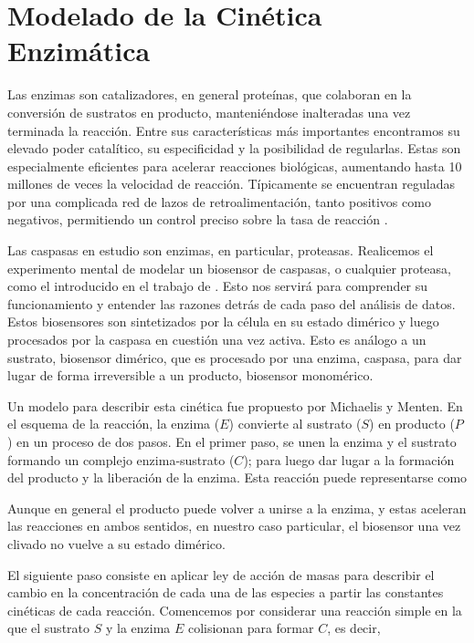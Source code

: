 \section{Modelado de la Cinética Enzimática}
\label{sec:CineticaEnzimatica}


Las enzimas son catalizadores, en general proteínas, que colaboran en la conversión de sustratos en producto, manteniéndose inalteradas una vez terminada la reacción. Entre sus características más importantes encontramos su elevado poder catalítico, su especificidad y la posibilidad de regularlas. Estas son especialmente eficientes para acelerar reacciones biológicas, aumentando hasta 10 millones de veces la velocidad de reacción. Típicamente se encuentran reguladas por una complicada red de lazos de retroalimentación, tanto positivos como negativos, permitiendo un control preciso sobre la tasa de reacción \citep{Keener2009}.

Las caspasas en estudio son enzimas, en particular, proteasas. Realicemos el experimento mental de modelar un biosensor de caspasas, o cualquier proteasa, como el introducido en el trabajo de \cite{Stegemann2015}. Esto nos servirá para comprender su funcionamiento y entender las razones detrás de cada paso del análisis de datos. Estos biosensores son sintetizados por la célula en su estado dimérico y luego procesados por la caspasa en cuestión una vez activa. Esto es análogo a un sustrato, biosensor dimérico, que es procesado por una enzima, caspasa, para dar lugar de forma irreversible a un producto, biosensor monomérico.

Un modelo para describir esta cinética fue propuesto por Michaelis y Menten. En el esquema de la reacción, la enzima ($E$) convierte al sustrato ($S$) en producto ($P$) en un proceso de dos pasos. En el primer paso, se unen la enzima y el sustrato formando un complejo enzima-sustrato ($C$); para luego dar lugar a la formación del producto y la liberación de la enzima. Esta reacción puede representarse como

\begin{center}
\end{center}

\noindent Aunque en general el producto puede volver a unirse a la enzima, y estas aceleran las reacciones en ambos sentidos, en nuestro caso particular, el biosensor una vez clivado no vuelve a su estado dimérico.

El siguiente paso consiste en aplicar ley de acción de masas para describir el cambio en la concentración de cada una de las especies a partir las constantes cinéticas de cada reacción. Comencemos por considerar una reacción simple en la que el sustrato $S$ y la enzima $E$ colisionan para formar $C$, es decir,

